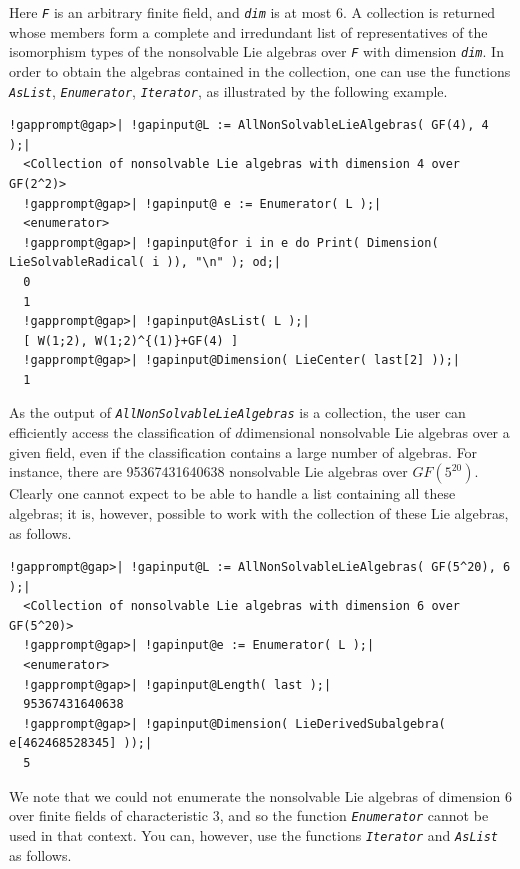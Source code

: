 \documentclass[a4paper,11pt]{report}
\begin{document}
{{{ Here \mbox{\texttt{\mdseries\slshape F}} is an arbitrary finite field, and \mbox{\texttt{\mdseries\slshape dim}} is at most 6. A collection is returned whose members form a complete and
irredundant list of representatives of the isomorphism types of the
non\texttt{}solvable Lie algebras over \mbox{\texttt{\mdseries\slshape F}} with dimension \mbox{\texttt{\mdseries\slshape dim}}. In order to obtain the algebras contained in the collection, one can use the
functions \mbox{\texttt{\mdseries\slshape AsList}}, \mbox{\texttt{\mdseries\slshape Enumerator}}, \mbox{\texttt{\mdseries\slshape Iterator}}, as illustrated by the following example. 
\begin{Verbatim}[commandchars=!@|,fontsize=\small,frame=single,label=Example]
  !gapprompt@gap>| !gapinput@L := AllNonSolvableLieAlgebras( GF(4), 4 );|
  <Collection of nonsolvable Lie algebras with dimension 4 over GF(2^2)>
  !gapprompt@gap>| !gapinput@ e := Enumerator( L );|
  <enumerator>
  !gapprompt@gap>| !gapinput@for i in e do Print( Dimension( LieSolvableRadical( i )), "\n" ); od;|
  0
  1
  !gapprompt@gap>| !gapinput@AsList( L );|
  [ W(1;2), W(1;2)^{(1)}+GF(4) ]
  !gapprompt@gap>| !gapinput@Dimension( LieCenter( last[2] ));|
  1
\end{Verbatim}
 As the output of \mbox{\texttt{\mdseries\slshape AllNonSolvableLieAlgebras}} is a collection, the user can efficiently access the classification of $d$\texttt{}dimensional non\texttt{}solvable Lie algebras
over a given field, even if the classification contains a large number of
algebras. For instance, there are 95367431640638
non\texttt{}solvable Lie algebras over $GF(5^{20})$. Clearly one cannot expect to be able to handle a list containing all these
algebras; it is, however, possible to work with the collection of these Lie
algebras, as follows. 
\begin{Verbatim}[commandchars=!@|,fontsize=\small,frame=single,label=Example]
  !gapprompt@gap>| !gapinput@L := AllNonSolvableLieAlgebras( GF(5^20), 6 );|
  <Collection of nonsolvable Lie algebras with dimension 6 over GF(5^20)>
  !gapprompt@gap>| !gapinput@e := Enumerator( L );|
  <enumerator>
  !gapprompt@gap>| !gapinput@Length( last );|
  95367431640638
  !gapprompt@gap>| !gapinput@Dimension( LieDerivedSubalgebra( e[462468528345] ));|
  5
\end{Verbatim}
 We note that we could not enumerate the non\texttt{}solvable Lie
algebras of dimension 6 over finite fields of characteristic 3, and so the
function \mbox{\texttt{\mdseries\slshape Enumerator}} cannot be used in that context. You can, however, use the functions \mbox{\texttt{\mdseries\slshape Iterator}} and \mbox{\texttt{\mdseries\slshape AsList}} as follows. 
}}}
\end{document}
